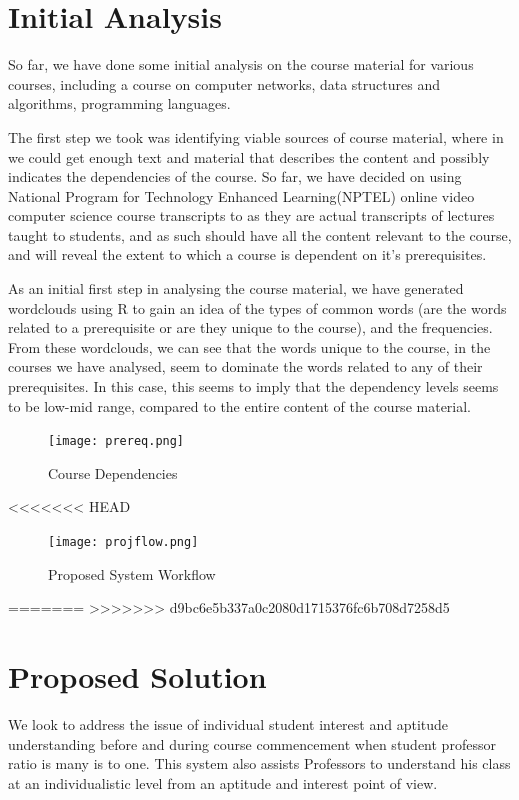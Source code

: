 \documentclass[conference]{IEEEtran}
\begin{document}
	\section{Initial Analysis}
So far, we have done some initial analysis on the course material for various courses, including a course on computer networks, data structures and algorithms, programming languages.

The first step we took was identifying viable sources of course material, where in we could get enough text and material that describes the content and possibly indicates the dependencies of the course. So far, we have decided on using National Program for Technology Enhanced Learning(NPTEL)\cite{nptel} online video computer science course transcripts to as they are actual transcripts of lectures taught to students, and as such should have all the content relevant to the course, and will reveal the extent to which a course is dependent on it's prerequisites.

As an initial first step in analysing the course material, we have generated wordclouds using R\cite{r} to gain an idea of the types of common words (are the words related to a prerequisite or are they unique to the course), and the frequencies. From these wordclouds, we can see that the words unique to the course, in the courses we have analysed, seem to dominate the words related to any of their prerequisites. In this case, this seems to imply that the dependency levels seems to be low-mid range, compared to the entire content of the course material.

\begin{figure}
	\texttt{[image: prereq.png]}
	\caption{Course Dependencies}
	\label{fig:prereq}
\end{figure}
<<<<<<< HEAD
\begin{figure}
	\texttt{[image: projflow.png]}
	\caption{Proposed System Workflow}
	\label{fig:projflow}
\end{figure}

=======
>>>>>>> d9bc6e5b337a0c2080d1715376fc6b708d7258d5
	\section{Proposed Solution}
We look to address the issue of individual student interest and aptitude understanding before and during course commencement when student professor ratio is many is to one. This system also assists Professors to understand his class at an individualistic level from an aptitude and interest point of view.
\end{document}
